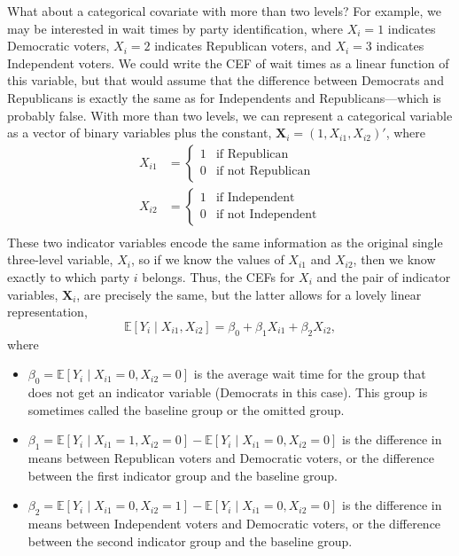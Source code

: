 \documentclass[
  13pt,
  letterpaper,
  DIV=11,
  numbers=noendperiod]{scrreprt}
\providecommand{\tightlist}{%
  \setlength{\itemsep}{0pt}\setlength{\parskip}{0pt}}
\newcommand{\mb}{\bm}
\newcommand{\E}{\mathbb{E}}
\newcommand{\X}{\mb{X}}
\theoremstyle{plain}
\theoremstyle{plain}
\theoremstyle{definition}
\theoremstyle{definition}
\theoremstyle{remark}
\begin{document}
What about a categorical covariate with more than two levels? For
example, we may be interested in wait times by party identification,
where \(X_i = 1\) indicates Democratic voters, \(X_i = 2\) indicates
Republican voters, and \(X_i = 3\) indicates Independent voters. We
could write the CEF of wait times as a linear function of this variable,
but that would assume that the difference between Democrats and
Republicans is exactly the same as for Independents and
Republicans---which is probably false. With more than two levels, we can
represent a categorical variable as a vector of binary variables plus
the constant, \(\X_i = (1, X_{i1}, X_{i2})'\), where \[ 
\begin{aligned}
  X_{i1} &= \begin{cases}
                1&\text{if Republican} \\
                   0 & \text{if not Republican}
              \end{cases} \\
X_{i2} &= \begin{cases}
                1&\text{if Independent} \\
                   0 & \text{if not Independent}
              \end{cases} \\
\end{aligned}
\] These two indicator variables encode the same information as the
original single three-level variable, \(X_{i}\), so if we know the
values of \(X_{i1}\) and \(X_{i2}\), then we know exactly to which party
\(i\) belongs. Thus, the CEFs for \(X_i\) and the pair of indicator
variables, \(\X_i\), are precisely the same, but the latter allows for a
lovely linear representation, \[
\E[Y_i \mid X_{i1}, X_{i2}] = \beta_0 + \beta_1 X_{i1} + \beta_2 X_{i2},
\] where

\begin{itemize}
\tightlist
\item
  \(\beta_0 = \E[Y_{i} \mid X_{i1} = 0, X_{i2} = 0]\) is the average
  wait time for the group that does not get an indicator variable
  (Democrats in this case). This group is sometimes called the baseline
  group or the omitted group.
\item
  \(\beta_1 = \E[Y_{i} \mid X_{i1} = 1, X_{i2} = 0] - \E[Y_{i} \mid X_{i1} = 0, X_{i2} = 0]\)
  is the difference in means between Republican voters and Democratic
  voters, or the difference between the first indicator group and the
  baseline group.
\item
  \(\beta_2 = \E[Y_{i} \mid X_{i1} = 0, X_{i2} = 1] - \E[Y_{i} \mid X_{i1} = 0, X_{i2} = 0]\)
  is the difference in means between Independent voters and Democratic
  voters, or the difference between the second indicator group and the
  baseline group.
\end{itemize}
\end{document}
